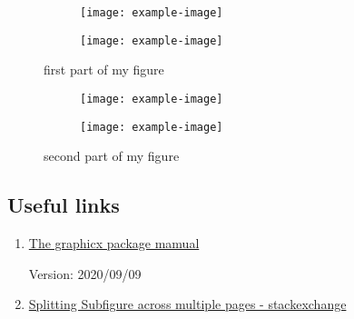 \begin{figure}[b]
    \begin{subfigure}[t]{0.45\hsize}
        \texttt{[image: example-image]}
        \caption{}
    \end{subfigure}   
    \begin{subfigure}[t]{0.45\hsize}
        \texttt{[image: example-image]}
        \caption{}
    \end{subfigure}
    \caption{first part of my figure}
\end{figure}
\clearpage   
\begin{figure}[tb]\ContinuedFloat
    \begin{subfigure}[t]{0.45\hsize}
        \texttt{[image: example-image]}
        \caption{}
    \end{subfigure}
    \begin{subfigure}[t]{0.45\hsize}
        \texttt{[image: example-image]}
        \caption{}
    \end{subfigure}
    \caption{second part of my figure}
\end{figure}


\subsection{Useful links}

\begin{enumerate}

    \item \href{https://texdoc.org/serve/graphicx.pdf/0}{The graphicx package mamual}

    Version: 2020/09/09
    \item \href{https://tex.stackexchange.com/questions/298738/splitting-subfigure-across-multiple-pages}{Splitting Subfigure across multiple pages - stackexchange}
    
    
\end{enumerate}

